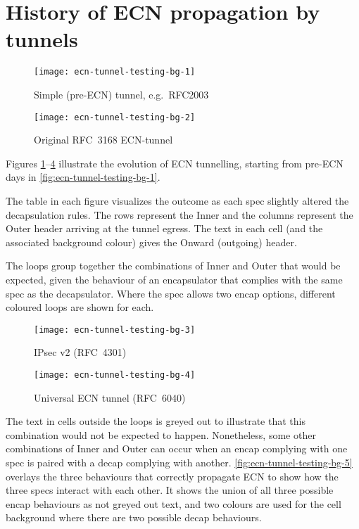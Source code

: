 \section{History of ECN propagation by tunnels}\label{ecn-encap-test_History}

\begin{figure}[h]
	\centering
	\texttt{[image: ecn-tunnel-testing-bg-1]}
	\caption{Simple (pre-ECN) tunnel, e.g.\ RFC2003}\label{fig:ecn-tunnel-testing-bg-1}
\end{figure}
\begin{figure}[h]
	\centering
	\texttt{[image: ecn-tunnel-testing-bg-2]}
	\caption{Original RFC~3168 ECN-tunnel~\cite{rfc3168}}\label{fig:ecn-tunnel-testing-bg-2}
\end{figure}

Figures \ref{fig:ecn-tunnel-testing-bg-1}--\ref{fig:ecn-tunnel-testing-bg-4} illustrate the evolution of ECN tunnelling, starting from pre-ECN days in \autoref{fig:ecn-tunnel-testing-bg-1}.

The table in each figure visualizes the outcome as each spec slightly altered the decapsulation rules. The rows represent the Inner and the columns represent the Outer header arriving at the tunnel egress. The text in each cell (and the associated background colour) gives the Onward (outgoing) header. 

The loops group together the combinations of Inner and Outer that would be expected, given the behaviour of an encapsulator that complies with the same spec as the decapsulator. Where the spec allows two encap options, different coloured loops are shown for each.

\newpage
\begin{figure}[h]
	\centering
	\texttt{[image: ecn-tunnel-testing-bg-3]}
	\caption{IPsec v2 (RFC~4301)~\cite{IETF_RFC4301:IPSEC_architecture}}\label{fig:ecn-tunnel-testing-bg-3}
\end{figure}
\begin{figure}[h]
	\centering
	\texttt{[image: ecn-tunnel-testing-bg-4]}
	\caption{Universal ECN tunnel (RFC~6040)~\cite{Briscoe07b:ECN-tunnel}}\label{fig:ecn-tunnel-testing-bg-4}
\end{figure}

The text in cells outside the loops is greyed out to illustrate that this combination would not be expected to happen. Nonetheless, some other combinations of Inner and Outer can occur when an encap complying with one spec is paired with a decap complying with another. \autoref{fig:ecn-tunnel-testing-bg-5} overlays the three behaviours that correctly propagate ECN to show how the three specs interact with each other. It shows the union of all three possible encap behaviours as not greyed out text, and two colours are used for the cell background where there are two possible decap behaviours.

